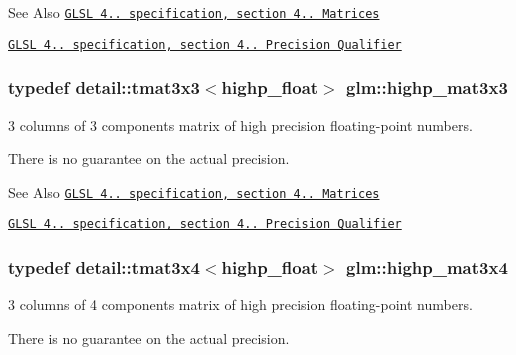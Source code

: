 \begin{DoxySeeAlso}{See Also}
\href{http://www.opengl.org/registry/doc/GLSLangSpec.4.20.8.pdf}{\tt G\-L\-S\-L 4.. specification, section 4.. Matrices} 

\href{http://www.opengl.org/registry/doc/GLSLangSpec.4.20.8.pdf}{\tt G\-L\-S\-L 4.. specification, section 4.. Precision Qualifier} 
\end{DoxySeeAlso}
\hypertarget{group__core__precision_ga072d1e03e15a20a108632540802c9a7d}{
\subsubsection[{highp\-\_\-mat3x3}]{\setlength{\rightskip}{0pt plus 5cm}typedef detail\-::tmat3x3$<$highp\-\_\-float$>$ {\bf glm\-::highp\-\_\-mat3x3}}}\label{group__core__precision_ga072d1e03e15a20a108632540802c9a7d}


3 columns of 3 components matrix of high precision floating-\/point numbers. 

There is no guarantee on the actual precision.

\begin{DoxySeeAlso}{See Also}
\href{http://www.opengl.org/registry/doc/GLSLangSpec.4.20.8.pdf}{\tt G\-L\-S\-L 4.. specification, section 4.. Matrices} 

\href{http://www.opengl.org/registry/doc/GLSLangSpec.4.20.8.pdf}{\tt G\-L\-S\-L 4.. specification, section 4.. Precision Qualifier} 
\end{DoxySeeAlso}
\hypertarget{group__core__precision_ga55fe92f6217fa20816f52f748fb399c7}{
\subsubsection[{highp\-\_\-mat3x4}]{\setlength{\rightskip}{0pt plus 5cm}typedef detail\-::tmat3x4$<$highp\-\_\-float$>$ {\bf glm\-::highp\-\_\-mat3x4}}}\label{group__core__precision_ga55fe92f6217fa20816f52f748fb399c7}


3 columns of 4 components matrix of high precision floating-\/point numbers. 

There is no guarantee on the actual precision.

